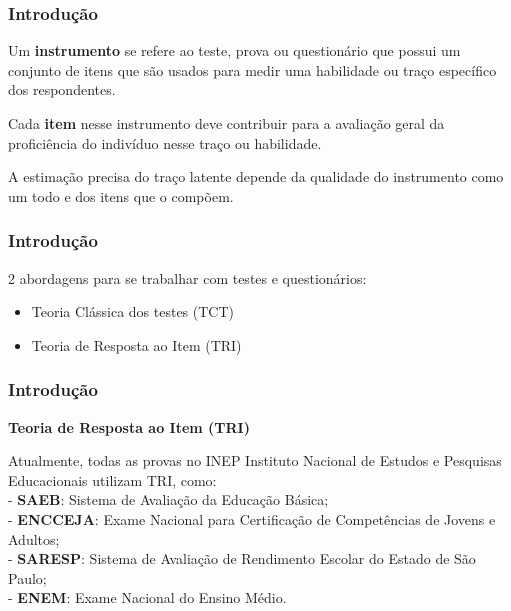 \documentclass{beamer}
\begin{document}
		
\begin{frame}
	
	\frametitle{Introdução}

		
		Um \textbf{instrumento} se refere ao teste, prova ou questionário que possui um conjunto de itens que são usados para medir uma habilidade ou traço específico dos respondentes. \newline

		
		 Cada \textbf{item} nesse instrumento deve contribuir para a avaliação geral da proficiência do indivíduo nesse traço ou habilidade. \newline 
		
		A estimação precisa do traço latente depende da qualidade do instrumento como um todo e dos itens que o compõem.

\end{frame}

\begin{frame}
	\frametitle{Introdução}
	2 abordagens para se trabalhar com testes e questionários:
	
	
	\begin{itemize}
		\item Teoria Clássica dos testes (TCT)
		
		\item Teoria de Resposta ao Item (TRI)
	\end{itemize}	
	
	
	
	
\end{frame}

\begin{frame}
	
	\frametitle{Introdução}
	
	\begin{center}
			\textbf{Teoria de Resposta ao Item (TRI)}
	\end{center}
	
	 Atualmente, todas as provas no INEP Instituto Nacional de Estudos e Pesquisas Educacionais utilizam TRI, como:\\
	 
	 
	 - \textbf{SAEB}: Sistema de Avaliação da Educação Básica; \\
	 
	 - \textbf{ENCCEJA}: Exame Nacional para Certificação de Competências de Jovens e Adultos;\\
	 
	 - \textbf{SARESP}: Sistema de Avaliação de Rendimento Escolar do Estado de São Paulo; \\
	 
	 - \textbf{ENEM}: Exame Nacional do Ensino Médio.
		
	
\end{frame}
\end{document}
